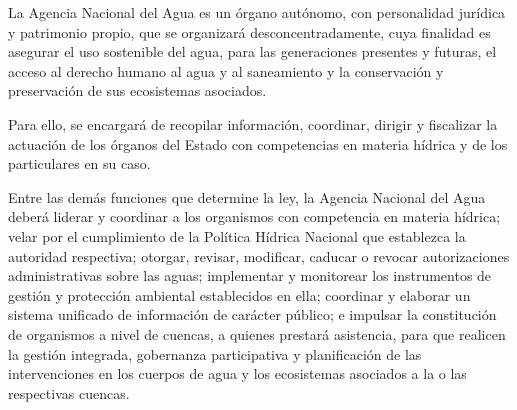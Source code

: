 \documentclass[11pt, a4paper]{article}
\begin{document}
\begin{enumerate}
La Agencia Nacional del Agua es un órgano autónomo, con personalidad jurídica y patrimonio propio, que se organizará desconcentradamente, cuya finalidad es asegurar el uso sostenible del agua, para las generaciones presentes y futuras, el acceso al derecho humano al agua y al saneamiento y la conservación y preservación de sus ecosistemas asociados. 

Para ello, se encargará de recopilar información, coordinar, dirigir y fiscalizar la actuación de los órganos del Estado con competencias en materia hídrica y de los particulares en su caso. 

Entre las demás funciones que determine la ley, la Agencia Nacional del Agua deberá liderar y coordinar a los organismos con competencia en materia hídrica; velar por el cumplimiento de la Política Hídrica Nacional que establezca la autoridad respectiva; otorgar, revisar, modificar, caducar o revocar autorizaciones administrativas sobre las aguas; implementar y monitorear los instrumentos de gestión y protección ambiental establecidos en ella; coordinar y elaborar un sistema unificado de información de carácter público; e impulsar la constitución de organismos a nivel de cuencas, a quienes prestará asistencia, para que realicen la gestión integrada, gobernanza participativa y planificación de las intervenciones en los cuerpos de agua y los ecosistemas asociados a la o las respectivas cuencas. 



\end{enumerate}
\end{document}
